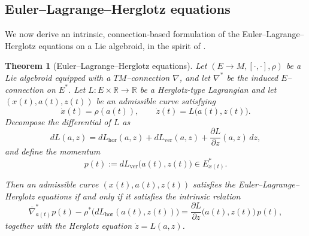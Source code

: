 \documentclass[11pt,a4paper]{article}
\newtheorem{theorem}{Theorem}[section]
\theoremstyle{definition}
\begin{document}
\subsection{Euler--Lagrange--Herglotz equations}

We now derive an intrinsic, connection-based formulation of the
Euler--Lagrange--Herglotz equations on a Lie algebroid,
in the spirit of \cite{li2017lagrangian}.%

\begin{theorem}[Euler--Lagrange--Herglotz equations]
\label{thm:ELP_Herglotz}
Let $(E\to M,[\cdot,\cdot],\rho)$ be a Lie algebroid equipped with a 
$TM$--connection $\nabla$, and let $\nabla^*$ be the induced $E$--connection
on $E^*$.  
Let $L\colon E\times\mathbb{R}\to\mathbb{R}$ be a Herglotz-type Lagrangian and let
$(x(t),a(t),z(t))$ be an admissible curve satisfying
\[
\dot x(t)=\rho(a(t)),
\qquad
\dot z(t)=L\big(a(t),z(t)\big).
\]
Decompose the differential of $L$ as
\[
dL(a,z)=dL_{\mathrm{hor}}(a,z)+dL_{\mathrm{ver}}(a,z)
+\frac{\partial L}{\partial z}(a,z)\,dz,
\]
and define the momentum
\[
p(t):=dL_{\mathrm{ver}}\big(a(t),z(t)\big)\in E^*_{x(t)}.
\]

Then an admissible curve $(x(t),a(t),z(t))$ satisfies the Euler--Lagrange--Herglotz
equations if and only if it satisfies the intrinsic relation
\begin{equation}\label{eq:ELP_Herglotz_intrinsic_short}
\overline{\nabla}^*_{a(t)}p(t)
-
\rho^*\!\big(dL_{\mathrm{hor}}(a(t),z(t))\big)
=\frac{\partial L}{\partial z}\big(a(t),z(t)\big)\,p(t),
\end{equation}
together with the Herglotz equation $\dot z=L(a,z)$.
\end{theorem}
\end{document}
